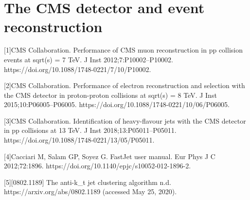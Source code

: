 \section{The CMS detector and event reconstruction}
[1]CMS Collaboration. Performance of CMS muon reconstruction in pp collision events at sqrt(s) = 7 TeV. J Inst 2012;7:P10002–P10002. https://doi.org/10.1088/1748-0221/7/10/P10002.

[2]CMS Collaboration. Performance of electron reconstruction and selection with the CMS detector in proton-proton collisions at sqrt(s) = 8 TeV. J Inst 2015;10:P06005–P06005. https://doi.org/10.1088/1748-0221/10/06/P06005.

[3]CMS Collaboration. Identification of heavy-flavour jets with the CMS detector in pp collisions at 13 TeV. J Inst 2018;13:P05011–P05011. https://doi.org/10.1088/1748-0221/13/05/P05011.

[4]Cacciari M, Salam GP, Soyez G. FastJet user manual. Eur Phys J C 2012;72:1896. https://doi.org/10.1140/epjc/s10052-012-1896-2.

[5][0802.1189] The anti-k\_t jet clustering algorithm n.d. https://arxiv.org/abs/0802.1189 (accessed May 25, 2020).


\newpage\phantom{blabla}
\newpage\phantom{blabla}
